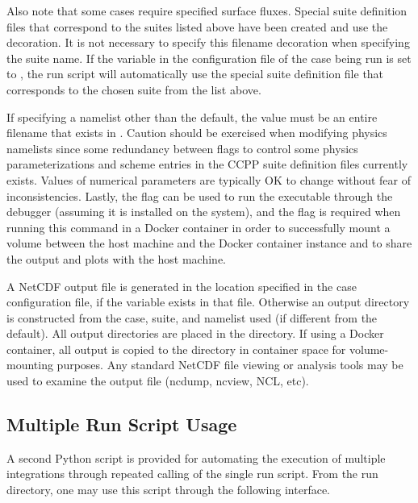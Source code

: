 Also note that some cases require specified surface fluxes. Special suite definition files that correspond to the suites listed above have been created and use the  decoration. It is not necessary to specify this filename decoration when specifying the suite name. If the  variable in the configuration file of the case being run is set to , the run script will automatically use the special suite definition file that corresponds to the chosen suite from the list above.

If specifying a namelist other than the default, the value must be an entire filename that exists in . Caution should be exercised when modifying physics namelists since some redundancy between flags to control some physics parameterizations and scheme entries in the CCPP suite definition files currently exists. Values of numerical parameters are typically OK to change without fear of inconsistencies. Lastly, the  flag can be used to run the executable through the  debugger (assuming it is installed on the system), and the  flag is required when running this command in a Docker container in order to successfully mount a volume between the host machine and the Docker container instance and to share the output and plots with the host machine.

A NetCDF output file is generated in the location specified in the case
configuration file, if the  variable exists in that file. Otherwise an output directory is constructed from the case, suite, and namelist used (if different from the default). All output directories are placed in the  directory. If using a Docker container, all output is copied to the  directory in container space for volume-mounting purposes. Any standard NetCDF file viewing or analysis tools may be used to
examine the output file (ncdump, ncview, NCL, etc).

\subsection{Multiple Run Script Usage}\label{subsection: multirunscript}

A second Python script is provided for automating the execution of multiple integrations through repeated calling of the single run script. From the run directory, one may use this script through the following interface.

